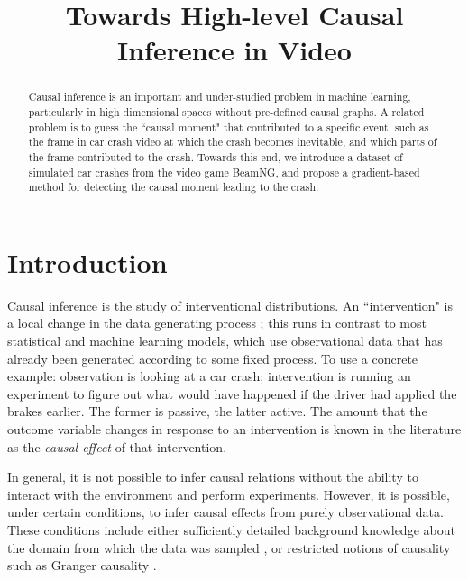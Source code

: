 \documentclass[letterpaper, twocolumn]{article} %
\title{Towards High-level Causal Inference in Video}
\date{}
\begin{document}
\maketitle

\begin{abstract}
Causal inference is an important and under-studied problem in machine learning, particularly in high dimensional spaces without pre-defined causal graphs. A related problem is to guess the ``causal moment" that contributed to a specific event, such as the frame in car crash video at which the crash becomes inevitable, and which parts of the frame contributed to the crash. Towards this end, we introduce a dataset of simulated car crashes from the video game BeamNG, and propose a gradient-based method for detecting the causal moment leading to the crash.
\end{abstract}

\section{Introduction}
\noindent Causal inference is the study of interventional distributions. An ``intervention" is a local change in the data generating process \cite{pearl2009causal}; this runs in contrast to most statistical and machine learning models, which use observational data that has already been generated according to some fixed process. To use a concrete example: observation is looking at a car crash; intervention is running an experiment to figure out what would have happened if the driver had applied the brakes earlier. The former is passive, the latter active. The amount that the outcome variable changes in response to an intervention is known in the literature as the \emph{causal effect} of that intervention.

In general, it is not possible to infer causal relations without the ability to interact with the environment and perform experiments. However, it is possible, under certain conditions, to infer causal effects from purely observational data. These conditions include either sufficiently detailed background knowledge about the domain from which the data was sampled \cite{pearl2009causal} \cite{rosenbaum1983central}, or restricted notions of causality such as Granger causality \cite{granger1969investigating} \cite{granger1980testing}.
\end{document}
